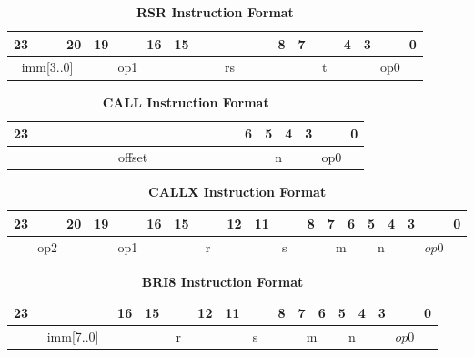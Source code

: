 \begin{table}[H]
    \caption{\textbf{RSR Instruction Format}}
    \begin{tabular}{llllllllllllllllllllllll}
        23 & & & 20 & 19 & & & 16 & 15 & & & & & & & 8 & 7 & & & 4 & 3 & & & 0 \\
        \hline
        \multicolumn{4}{|c|}{imm[3..0]} & \multicolumn{4}{c|}{op1} &\multicolumn{8}{c|}{rs} & \multicolumn{4}{c|}{t} & \multicolumn{4}{c|}{op0}\\
        \hline
    \end{tabular}
\end{table}

\begin{table}[H]
    \caption{\textbf{CALL Instruction Format}}
    \begin{tabular}{llllllllllllllllllllllll}
        23 & & & & & & & & & & & & & & & & & 6 & 5 & 4 & 3 & & & 0 \\
        \hline
        \multicolumn{18}{|c|}{offset} & \multicolumn{2}{c|}{n} & \multicolumn{4}{c|}{op0}\\
        \hline
    \end{tabular}
\end{table}

\begin{table}[H]
    \caption{\textbf{CALLX Instruction Format}}
    \begin{tabular}{llllllllllllllllllllllll}
        23 & & & 20 & 19 & & & 16 & 15 & & & 12 & 11 & & & 8 & 7 & 6 & 5 & 4 & 3 & & & 0 \\
        \hline
        \multicolumn{4}{|c|}{op2} & \multicolumn{4}{c|}{op1} & \multicolumn{4}{c|}{r} & \multicolumn{4}{c|}{s} & \multicolumn{2}{c|}{m} & \multicolumn{2}{c|}{n} & \multicolumn{4}{c|}{$op0$}\\
        \hline
    \end{tabular}
\end{table}

\begin{table}[H]
    \caption{\textbf{BRI8 Instruction Format}}
    \begin{tabular}{llllllllllllllllllllllll}
        23 & & & & & & & 16 & 15 & & & 12 & 11 & & & 8 & 7 & 6 & 5 & 4 & 3 & & & 0 \\
        \hline
        \multicolumn{8}{|c|}{imm[7..0]} & \multicolumn{4}{c|}{r} & \multicolumn{4}{c|}{s} & \multicolumn{2}{c|}{m} & \multicolumn{2}{c|}{n} & \multicolumn{4}{c|}{$op0$}\\
        \hline
    \end{tabular}
\end{table}

